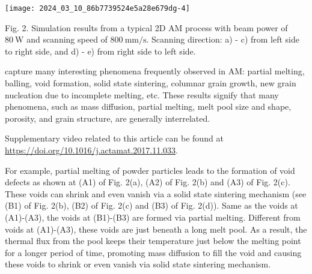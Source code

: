 \documentclass[10pt]{article}
\begin{document}
\begin{center}
\texttt{[image: 2024\_03\_10\_86b7739524e5a28e679dg-4]}
\end{center}

Fig. 2. Simulation results from a typical 2D AM process with beam power of $80 \mathrm{~W}$ and scanning speed of $800 \mathrm{~mm} / \mathrm{s}$. Scanning direction: a) - c) from left side to right side, and d) - e) from right side to left side.

capture many interesting phenomena frequently observed in AM: partial melting, balling, void formation, solid state sintering, columnar grain growth, new grain nucleation due to incomplete melting, etc. These results signify that many phenomena, such as mass diffusion, partial melting, melt pool size and shape, porosity, and grain structure, are generally interrelated.

Supplementary video related to this article can be found at \href{https://doi.org/10.1016/j.actamat.2017.11.033}{https://doi.org/10.1016/j.actamat.2017.11.033}.

For example, partial melting of powder particles leads to the formation of void defects as shown at (A1) of Fig. 2(a), (A2) of Fig. 2(b) and (A3) of Fig. 2(c). These voids can shrink and even vanish via a solid state sintering mechanism (see (B1) of Fig. 2(b), (B2) of Fig. 2(c) and (B3) of Fig. 2(d)). Same as the voids at (A1)-(A3), the voids at (B1)-(B3) are formed via partial melting. Different from voids at (A1)-(A3), these voids are just beneath a long melt pool. As a result, the thermal flux from the pool keeps their temperature just below the melting point for a longer period of time, promoting mass diffusion to fill the void and causing these voids to shrink or even vanish via solid state sintering mechanism.
\end{document}
